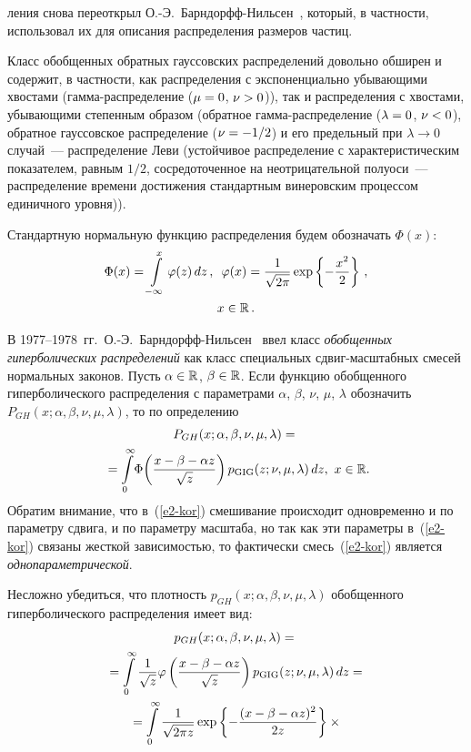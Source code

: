 \begin{multicols}{2}
\noindent
ления снова переоткрыл
О.-Э.~Барн\-дорфф-Ниль\-сен~\cite{BN1977, BN1978}, который, в частности,
использовал их для описания распределения размеров частиц.

Класс обобщенных обратных гауссовских распределений довольно обширен
и содержит, в част\-ности, как распределения с экспоненциально
убывающими хвостами (гам\-ма-рас\-пре\-де\-ле\-ние ($\mu\hm=0$, $\nu\hm>0$)), так и
распределения с хвостами, убывающими степенным образом (обратное
гам\-ма-рас\-пре\-де\-ле\-ние ($\lambda\hm=0$, $\nu\hm<0$), обратное гауссовское
распределение ($\nu\hm=-1/2$) и его предельный при $\lambda\to0$
случай~--- распределение Леви (устойчивое распределение с
характеристическим показателем, равным $1/2$, сосредоточенное на
неотрицательной полуоси~--- распределение времени достижения
стандартным винеровским процессом единичного уровня)).

Стандартную нормальную функцию распределения будем обозначать
$\Phi(x)$:
\begin{multline*}
\Phi(x)=\int\limits_{-\infty}^{x}\varphi(z)\,dz\,,\enskip
\varphi(x)=\displaystyle\frac{\displaystyle 1\mathstrut}{\displaystyle \sqrt{2\pi}\mathstrut}\exp\left\{-\displaystyle\frac{\displaystyle x^2\mathstrut}{\displaystyle 2\mathstrut}\right\}\,,\\
x\in\mathbb{R}\,.
\end{multline*}

В 1977--1978~гг.\ О.-Э.~Барндорфф-Ниль\-сен~\cite{BN1977, BN1978} ввел
класс {\it обобщенных гиперболических распределений} как класс
специальных сдвиг-мас\-штаб\-ных смесей нормальных законов. Пусть
$\alpha\hm\in\r$, $\beta\hm\in\r$. Если функцию обобщенного
гиперболического распределения с параметрами $\alpha$, $\beta$,
$\nu$, $\mu$, $\lambda$ обозначить
$P_{GH}(x;\alpha,\beta,\nu,\mu,\lambda)$, то по определению
\begin{multline}
P_{GH}(x;\alpha,\beta,\nu,\mu,\lambda)={}\\
{}=
\int\limits_{0}^{\infty}\!\Phi\!\left(\displaystyle\frac{\displaystyle x-\beta-\alpha
z\mathstrut}{\displaystyle \sqrt{z}\mathstrut}\right)p_{\mathrm{GIG}}(z;\nu,\mu,\lambda)\,dz,\
x\in\mathbb{R}.\!
\label{e2-kor}
\end{multline}
Обратим внимание, что в~(\ref{e2-kor}) смешивание происходит одновременно и по
параметру сдвига, и по параметру масштаба, но так как эти параметры
в~(\ref{e2-kor})  связаны жесткой зависимостью, то фактически смесь~(\ref{e2-kor})
является {\it однопараметрической}.

Несложно убедиться, что плотность
$p_{GH}(x;\alpha,\beta,\nu,\mu,\lambda)$ обобщенного
гиперболического распределения имеет вид:
\begin{multline*}
p_{GH}(x;\alpha,\beta,\nu,\mu,\lambda)={}\\
{}=
\int\limits_{0}^{\infty}\displaystyle\frac{\displaystyle 1\mathstrut}{\displaystyle \sqrt{z}\mathstrut}\varphi\left(\displaystyle\frac{\displaystyle x-\beta-\alpha
z\mathstrut}{\displaystyle \sqrt{z}\mathstrut}\right)p_{\mathrm{GIG}}(z;\nu,\mu,\lambda)\,dz={}\\
{}
=\int\limits_{0}^{\infty}\displaystyle\frac{\displaystyle 1\mathstrut}{\displaystyle \sqrt{2\pi
z}\mathstrut}\exp\left\{-\displaystyle\frac{\displaystyle (x-\beta-\alpha
z)^2\mathstrut}{\displaystyle 2z\mathstrut}\right\}\times{}
\end{multline*}


\end{multicols}
